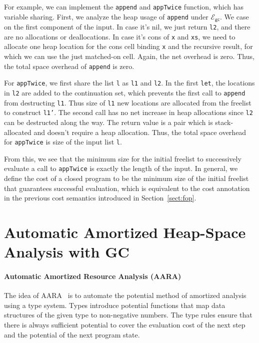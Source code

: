 \documentclass{easychair}
\newcommand{\ms}[1]{\ensuremath{\mathsf{#1}}}
\newcounter{rule}
\newcommand{\gcSem}{\ensuremath{\mathcal{E}_{\ms{gc}}}}
\theoremstyle{definition}
\begin{document}
For example, we can implement the \texttt{append} and \texttt{appTwice} function, 
which has variable sharing. First, we analyze the heap usage of \texttt{append} under 
\gcSem{}. We case on the first component of the input. In case it's nil, 
we just return \texttt{l2}, and there are no allocations or deallocations. In case it's
cons of \texttt{x} and \texttt{xs}, we need to allocate one heap location for the
cons cell binding \texttt{x} 
and the recursive result, for which we can use the just matched-on cell. Again, 
the net overhead is zero. Thus, the total space overhead of \texttt{append} is zero.

%
For \texttt{appTwice}, we first share the list \texttt{l} as \texttt{l1} and 
\texttt{l2}. In the first \texttt{let}, the locations in \texttt{l2} are added to the
continuation set, which prevents the 
first call to \texttt{append} from destructing \texttt{l1}. Thus size of \texttt{l1} 
new locations are allocated from the freelist to construct \texttt{l1'}. 
The second call has no net increase in heap allocations since \texttt{l2} can be 
destructed along the way. 
The return value is a pair which is stack-allocated and doesn't require a heap 
allocation. Thus, the total space overhead for \texttt{appTwice} 
is size of the input list \texttt{l}.

From this, we see that the minimum size for the initial freelist to successively evaluate 
a call to \texttt{appTwice} is exactly the length of the input. In general, we 
define the cost of a closed program to be the minimum size of the initial freelist that
guarantees successful evaluation, which is
equivalent to the cost annotation in the previous cost semantics introduced in 
Section~\ref{sect:fop}.


\section{Automatic Amortized Heap-Space Analysis with GC}
\label{sect:aara}

\paragraph{Automatic Amortized Resource Analysis (AARA)}
%
The idea of AARA~\cite{Jost03,Jost10,HoffmannAH10,HoffmannW15} is to automate the potential method of amortized
analysis using a type system.  Types introduce potential functions that
map data structures of the given type to non-negative numbers. The
type rules ensure that there is always sufficient potential to cover
the evaluation cost of the next step and the potential of the
next program state.
\end{document}
